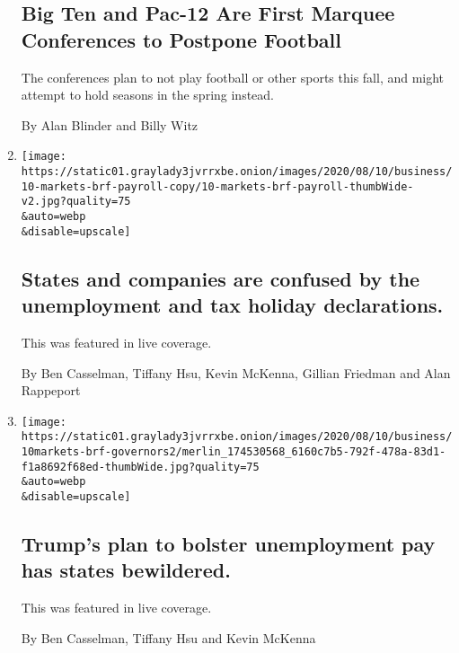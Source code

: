 \begin{enumerate}
  \hypertarget{big-ten-and-pac-12-are-first-marquee-conferences-to-postpone-football}{%
  \subsection{Big Ten and Pac-12 Are First Marquee Conferences to
  Postpone
  Football}\label{big-ten-and-pac-12-are-first-marquee-conferences-to-postpone-football}}

  The conferences plan to not play football or other sports this fall,
  and might attempt to hold seasons in the spring instead.

  By Alan Blinder and Billy Witz
\item
  \href{/live/2020/08/11/business/stock-market-today-coronavirus/states-and-companies-are-confused-by-the-unemployment-and-tax-holiday-declarations}{}

  \texttt{[image: https://static01.graylady3jvrrxbe.onion/images/2020/08/10/business/10-markets-brf-payroll-copy/10-markets-brf-payroll-thumbWide-v2.jpg?quality=75\\\&auto=webp\\\&disable=upscale]}

  \hypertarget{states-and-companies-are-confused-by-the-unemployment-and-tax-holiday-declarations}{%
  \subsection{States and companies are confused by the unemployment and
  tax holiday
  declarations.}\label{states-and-companies-are-confused-by-the-unemployment-and-tax-holiday-declarations}}

  This was featured in live coverage.

  By Ben Casselman, Tiffany Hsu, Kevin McKenna, Gillian Friedman and
  Alan Rappeport
\item
  \href{/live/2020/08/10/business/stock-market-today-coronavirus/trumps-plan-to-bolster-unemployment-pay-has-states-bewildered}{}

  \texttt{[image: https://static01.graylady3jvrrxbe.onion/images/2020/08/10/business/10markets-brf-governors2/merlin\_174530568\_6160c7b5-792f-478a-83d1-f1a8692f68ed-thumbWide.jpg?quality=75\\\&auto=webp\\\&disable=upscale]}

  \hypertarget{trumps-plan-to-bolster-unemployment-pay-has-states-bewildered}{%
  \subsection{Trump's plan to bolster unemployment pay has states
  bewildered.}\label{trumps-plan-to-bolster-unemployment-pay-has-states-bewildered}}

  This was featured in live coverage.

  By Ben Casselman, Tiffany Hsu and Kevin McKenna
\end{enumerate}

